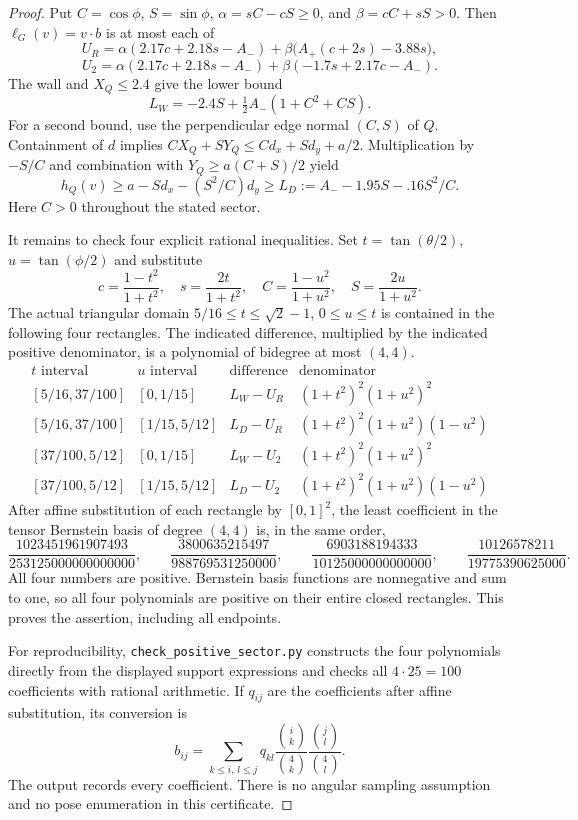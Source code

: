\documentclass[11pt]{article}
\begin{document}
\begin{proof}
Put $C=\cos\phi$, $S=\sin\phi$,
$\alpha=sC-cS\ge0$, and $\beta=cC+sS>0$.
Then $\ell_G(v)=v\cdot b$ is at most each of
\[
 U_R=\alpha(2.17c+2.18s-A_-)
       +\beta\bigl(A_+(c+2s)-3.88s\bigr),
\]
\[
 U_2=\alpha(2.17c+2.18s-A_-)
       +\beta(-1.7s+2.17c-A_-).
\]
The wall and $X_Q\le2.4$ give the lower bound
\[
 L_W=-2.4S+\tfrac12A_-(1+C^2+CS).
\]
For a second bound, use the perpendicular edge normal $(C,S)$ of $Q$.
Containment of $d$ implies
$CX_Q+SY_Q\le Cd_x+Sd_y+a/2$.
Multiplication by $-S/C$ and combination with
$Y_Q\ge a(C+S)/2$ yield
\[
 h_Q(v)\ge a-Sd_x-(S^2/C)d_y
 \ge L_D:=A_--1.95S-.16S^2/C.
\]
Here $C>0$ throughout the stated sector.

It remains to check four explicit rational inequalities. Set
$t=\tan(\theta/2)$, $u=\tan(\phi/2)$ and substitute
\[
 c=\frac{1-t^2}{1+t^2},\quad s=\frac{2t}{1+t^2},\quad
 C=\frac{1-u^2}{1+u^2},\quad S=\frac{2u}{1+u^2}.
\]
The actual triangular domain $5/16\le t\le\sqrt2-1$, $0\le u\le t$
is contained in the following four rectangles. The indicated difference,
multiplied by the indicated positive denominator, is a polynomial of
bidegree at most $(4,4)$.
\[
\begin{array}{c|c|c|c}
t\text{ interval}&u\text{ interval}&\text{difference}&\text{denominator}\\ \hline
{[5/16,37/100]}&[0,1/15]&L_W-U_R&(1+t^2)^2(1+u^2)^2\\
{[5/16,37/100]}&[1/15,5/12]&L_D-U_R&(1+t^2)^2(1+u^2)(1-u^2)\\
{[37/100,5/12]}&[0,1/15]&L_W-U_2&(1+t^2)^2(1+u^2)^2\\
{[37/100,5/12]}&[1/15,5/12]&L_D-U_2&(1+t^2)^2(1+u^2)(1-u^2)
\end{array}
\]
After affine substitution of each rectangle by $[0,1]^2$, the least
coefficient in the tensor Bernstein basis of degree $(4,4)$ is,
in the same order,
\[
 \frac{1023451961907493}{253125000000000000},\qquad
 \frac{3800635215497}{988769531250000},\qquad
 \frac{6903188194333}{10125000000000000},\qquad
 \frac{10126578211}{19775390625000}.
\]
All four numbers are positive. Bernstein basis functions are nonnegative
and sum to one, so all four polynomials are positive on their entire
closed rectangles. This proves the assertion, including all endpoints.

For reproducibility, \texttt{check\_positive\_sector.py} constructs the
four polynomials directly from the displayed support expressions and
checks all $4\cdot25=100$ coefficients with rational arithmetic. If
$q_{ij}$ are the coefficients after affine substitution, its conversion is
\[
 b_{ij}=\sum_{k\le i,\,l\le j}q_{kl}
 \frac{\binom{i}{k}}{\binom4k}
 \frac{\binom{j}{l}}{\binom4l}.
\]
The output records every coefficient. There is no angular sampling
assumption and no pose enumeration in this certificate.
\end{proof}
\end{document}
